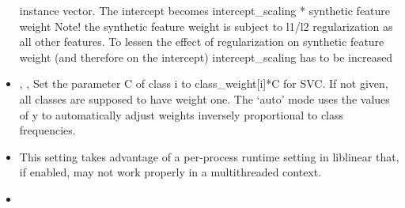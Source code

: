 \begin{itemize}
  instance vector.
  The intercept becomes intercept\_scaling * synthetic feature
  weight Note! the synthetic feature weight is subject to l1/l2 regularization
  as all other features.
  To lessen the effect of regularization on synthetic feature weight (and
  therefore on the intercept) intercept\_scaling has to be
  increased
  \item {}, ,
  Set the parameter C of class i to class\_weight[i]*C for SVC.
  If not given, all classes are supposed to have weight one.
  The `auto' mode uses the values of y to automatically adjust weights
  inversely proportional to class frequencies.
  \item \verDescriptionB
  \nb This setting takes advantage of a per-process runtime setting in
  liblinear that, if enabled, may not work properly in a multithreaded context.
  \item {}
\end{itemize}

